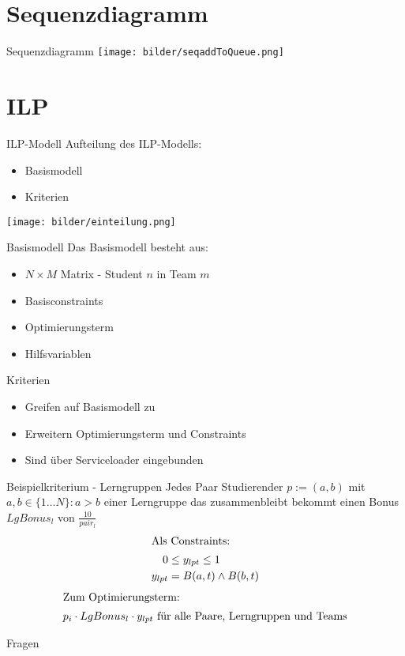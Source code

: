 \documentclass[18pt]{beamer}
\begin{document}
\section{Sequenzdiagramm} %
\begin{frame}{Sequenzdiagramm}
\texttt{[image: bilder/seqaddToQueue.png]}
\end{frame}

\section{ILP}
\begin{frame}{ILP-Modell}
Aufteilung des ILP-Modells:
\begin{itemize}
  \item Basismodell
  \item Kriterien
\end{itemize}
\texttt{[image: bilder/einteilung.png]}
\end{frame}

\begin{frame}{Basismodell}
Das Basismodell besteht aus:
\begin{itemize}
  \item $N \times M$ Matrix - Student $n$ in Team $m$
  \item Basisconstraints 
  \item Optimierungsterm
  \item Hilfsvariablen
\end{itemize}
\end{frame}

\begin{frame}{Kriterien}
\begin{itemize}
  \item Greifen auf Basismodell zu
  \item Erweitern Optimierungsterm und Constraints
  \item Sind über Serviceloader eingebunden
\end{itemize}
\end{frame}

\begin{frame}{Beispielkriterium - Lerngruppen} %
Jedes Paar Studierender $p:= (a,b)$ mit $a,b \in \{ 1\ldots N\}: a > b$
einer Lerngruppe das zusammenbleibt bekommt einen Bonus $LgBonus_l$ von
$\frac{10}{pair_l}$
\begin{align*}
\intertext{Als Constraints: }
0 &\le y_{lpt} \le 1  \\
y_{lpt} &= B(a,t) \wedge B(b,t)
\end{align*}
\begin{align*}
\intertext{Zum Optimierungsterm: } 
p_i \cdot LgBonus_l \cdot y_{lpt} \text{ für alle Paare, Lerngruppen und Teams}
\end{align*} 

\end{frame}

\appendix
\beginbackup

\begin{frame}{Fragen}
\printbibliography
\end{frame}

\backupend
\end{document}
